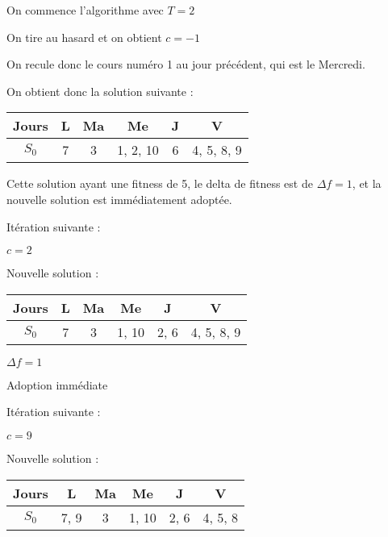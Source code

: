 {\setlength{\parindent}{0cm}

On commence l'algorithme avec $T=2$

On tire au hasard et on obtient $c = -1$

On recule donc le cours numéro 1 au jour précédent, qui est le Mercredi.

On obtient donc la solution suivante :


\begin{table}[!h]
    \centering
    \begin{tabular}{|c|c|c|c|c|c|}
        \hline
        Jours & L    & Ma    & Me   & J    & V    \\
        \hline
        $S_0$ & 7 & 3 & 1, 2, 10 & 6 & 4, 5, 8, 9 \\
        \hline
    \end{tabular}
\end{table}

Cette solution ayant une fitness de 5, le delta de fitness est de $\Delta f = 1$, et la nouvelle solution est immédiatement adoptée.

Itération suivante :

$c = 2$

Nouvelle solution : 

\begin{table}[!h]
    \centering
    \begin{tabular}{|c|c|c|c|c|c|}
        \hline
        Jours & L    & Ma    & Me   & J    & V    \\
        \hline
        $S_0$ & 7 & 3 & 1, 10 & 2, 6 & 4, 5, 8, 9 \\
        \hline
    \end{tabular}
\end{table}

$\Delta f = 1$

Adoption immédiate

Itération suivante :

$c = 9$

Nouvelle solution : 

\begin{table}[!h]
    \centering
    \begin{tabular}{|c|c|c|c|c|c|}
        \hline
        Jours & L    & Ma    & Me   & J    & V    \\
        \hline
        $S_0$ & 7, 9 & 3 & 1, 10 & 2, 6 & 4, 5, 8 \\
        \hline
    \end{tabular}
\end{table}

}
